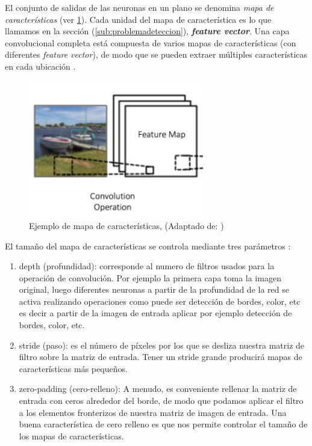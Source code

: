 El conjunto de salidas de las neuronas en un plano se denomina \textit{mapa de características} (ver \ref{Fig: fmaps}). Cada unidad  del mapa de característica es lo que llamamos en la sección (\ref{sub:problemadeteccion}),  \textit{\textbf{feature vector}}. Una capa convolucional completa está compuesta de varios mapas de características (con diferentes 
\textit{feature vector}), de modo que se pueden extraer múltiples características en cada ubicación \citep{cnns}.

\begin{figure}[H]
 \centering
  \includegraphics[height=6cm,keepaspectratio=true,clip=true]{imagenes/Logos/fmaps.png}
  \caption{Ejemplo de mapa de características, (Adaptado de: \citep{cnnsarticle})}
	\label{Fig: fmaps}
\end{figure}

El tamaño del mapa de características se controla mediante tres parámetros \citep{cnnsarticle}:
\begin{enumerate}
\item depth (profundidad): corresponde al numero de filtros usados para la operación de convolución. Por ejemplo la primera capa toma la imagen original, luego diferentes neuronas a partir de la profundidad de la red se activa realizando operaciones como puede ser detección de bordes, color, etc
es decir a partir de la imagen de entrada aplicar por ejemplo detección de bordes, color, etc.
\item stride (paso): es el número de píxeles por los que se desliza nuestra matriz de filtro sobre la matriz de entrada. Tener un stride grande producirá mapas de características más pequeños.
\item zero-padding (cero-relleno): A menudo, es conveniente rellenar la matriz de entrada con ceros alrededor del borde, de modo que podamos aplicar el filtro a los elementos fronterizos de nuestra matriz de imagen de entrada. Una buena característica de cero relleno es que nos permite controlar el tamaño de los mapas de características.
\end{enumerate}



